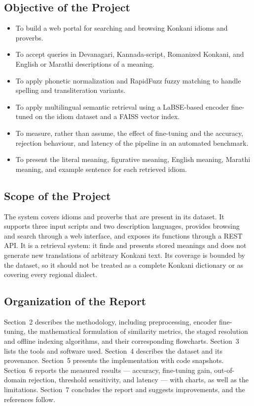 \documentclass[12pt,a4paper]{article}
\begin{document}
\subsection{Objective of the Project}
\begin{itemize}
  \item To build a web portal for searching and browsing Konkani idioms and proverbs.
  \item To accept queries in Devanagari, Kannada-script, Romanized Konkani, and English or Marathi descriptions of a meaning.
  \item To apply phonetic normalization and RapidFuzz fuzzy matching to handle spelling and transliteration variants.
  \item To apply multilingual semantic retrieval using a LaBSE-based encoder fine-tuned on the idiom dataset and a FAISS vector index.
  \item To measure, rather than assume, the effect of fine-tuning and the accuracy, rejection behaviour, and latency of the pipeline in an automated benchmark.
  \item To present the literal meaning, figurative meaning, English meaning, Marathi meaning, and example sentence for each retrieved idiom.
\end{itemize}

\subsection{Scope of the Project}
The system covers idioms and proverbs that are present in its dataset. It supports three input scripts and two description languages, provides browsing and search through a web interface, and exposes its functions through a REST API. It is a retrieval system: it finds and presents stored meanings and does not generate new translations of arbitrary Konkani text. Its coverage is bounded by the dataset, so it should not be treated as a complete Konkani dictionary or as covering every regional dialect.

\subsection{Organization of the Report}
Section~2 describes the methodology, including preprocessing, encoder fine-tuning, the mathematical formulation of similarity metrics, the staged resolution and offline indexing algorithms, and their corresponding flowcharts. Section~3 lists the tools and software used. Section~4 describes the dataset and its provenance. Section~5 presents the implementation with code snapshots. Section~6 reports the measured results --- accuracy, fine-tuning gain, out-of-domain rejection, threshold sensitivity, and latency --- with charts, as well as the limitations. Section~7 concludes the report and suggests improvements, and the references follow.
\end{document}
